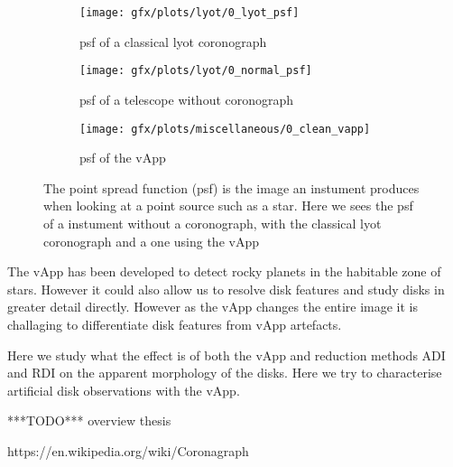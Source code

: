 \begin{figure}[h!]
      \begin{subfigure}[t]{0.5 \textwidth}
        \texttt{[image: gfx/plots/lyot/0\_lyot\_psf]}
        \label{fig:lyot}
        \caption{psf of a classical lyot coronograph}
      \end{subfigure}%
      \begin{subfigure}[t]{0.5\textwidth}
        \texttt{[image: gfx/plots/lyot/0\_normal\_psf]}
        \caption{psf of a telescope without coronograph}
      \end{subfigure}
      
      \begin{subfigure}[]{0.5\textwidth}
        \texttt{[image: gfx/plots/miscellaneous/0\_clean\_vapp]}
        \caption{psf of the vApp}
      \end{subfigure}
      
  \caption{The point spread function (psf) is the image an instument produces when looking at a point source such as a star. Here we sees the psf of a instument without a coronograph, with the classical lyot coronograph and a one using the vApp }
  \label{fig:vapp_vs_lyot}
\end{figure}

The vApp has been developed to detect rocky planets in the habitable zone of stars. However it could also allow us to resolve disk features and study disks in greater detail directly. However as the vApp changes the entire image it is challaging to differentiate disk features from vApp artefacts. 

Here we study what the effect is of both the vApp and reduction methods ADI and RDI on the apparent morphology of the disks. Here we try to characterise artificial disk observations with the vApp.


***TODO***
overview thesis


https://en.wikipedia.org/wiki/Coronagraph
